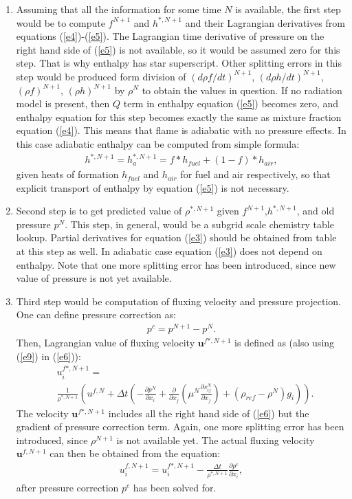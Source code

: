 \documentclass[fleqn,reqno]{amsart}
\newcommand{\pdd}[2]{\frac{\partial{#1}}{\partial{#2}}}
\newcommand{\inlineldd}[2]{d{#1}/d{#2}}
\begin{document}
\begin{enumerate}
\item{Assuming that all the information for some time $N$ is available, the first step would
be to compute $f^{N+1}$ and $h^{*,N+1}$ and their Lagrangian derivatives from
equations (\ref{e4})-(\ref{e5}). The Lagrangian time derivative of pressure
on the right hand side of (\ref{e5}) is not available, so it would be assumed zero for this step.
That is why enthalpy has star superscript.
Other splitting errors in this step would be produced form division of $(\inlineldd{\rho f}{t})^{N+1}$, 
$(\inlineldd{\rho h}{t})^{N+1}$, $(\rho f)^{N+1}$, $(\rho h)^{N+1}$ by $\rho^N$ to
obtain the values in question. If no radiation model is present, then $Q$ term in
enthalpy equation (\ref{e5}) becomes zero, and enthalpy equation for this step becomes exactly
the same as mixture fraction equation (\ref{e4}). This means that flame is adiabatic with
no pressure effects. In this case adiabatic enthalpy can be computed from simple formula:
\begin{align}
\label{e8}
h^{*,N+1}=h^{*,N+1}_a=f*h_{fuel}+(1-f)*h_{air},
\end{align}
given heats of formation $h_{fuel}$ and $h_{air}$ for fuel and air respectively, so that
explicit transport of enthalpy by equation (\ref{e5}) is not necessary.}

\item{Second step is to get predicted value of $\rho^{*,N+1}$ given $f^{N+1}$,$h^{*,N+1}$, and old pressure $p^N$.
This step, in general, would be a subgrid scale chemistry table lookup.
Partial derivatives for
equation (\ref{e3}) should be obtained from table at this step as well. 
In adiabatic case equation (\ref{e3}) does not depend on enthalpy. Note that one
more splitting error has been introduced, since new value of pressure is not yet
available.}

\item{Third step would be computation of fluxing velocity and pressure projection. 
One can define pressure correction as:
\begin{align}
\label{e9}
p^c=p^{N+1}-p^{N}.
\end{align}
Then, Lagrangian value
of fluxing velocity $\boldsymbol{u}^{f*,N+1}$ is defined as (also using (\ref{e9}) in (\ref{e6})):
\begin{align}
\label{e10}
&u^{f*,N+1}_i=\nonumber\\
&\frac{1}{\rho^{*,N+1}}\left(
u^{f,N}+\Delta t \left(-\pdd{p^N}{x_i}+\pdd{}{x_j}\left(\mu^N \pdd{s^N_{ij}}{x_j}\right)+
(\rho_{ref}-\rho^N)g_i\right)\right).
\end{align}
The velocity $\boldsymbol{u}^{f*,N+1}$ includes all the right hand side of (\ref{e6}) but the gradient of pressure correction term.
Again, one more splitting error has been introduced, since $\rho^{N+1}$ is not available yet.
The actual fluxing velocity $\boldsymbol{u}^{f,N+1}$ can then be obtained from the equation:
\begin{align}
\label{e11}
u^{f,N+1}_i=u^{f*,N+1}_i-\frac{\Delta t}{\rho^{*,N+1}}\pdd{p^c}{x_i},
\end{align}
after pressure correction $p^c$ has been solved for.

}
\end{enumerate}
\end{document}
